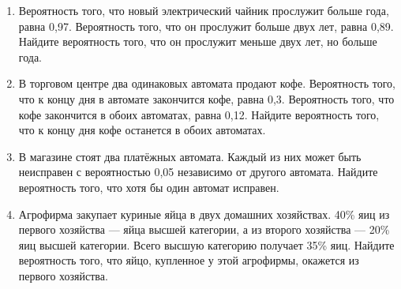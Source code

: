 \documentclass[pdftex,12pt,a4paper]{article}
\begin{document}
\begin{enumerate}

\item Вероятность того, что новый электрический чайник прослужит больше года, равна 0,97. Вероятность того, что он прослужит больше двух лет, равна 0,89. Найдите вероятность того, что он прослужит меньше двух лет, но больше года.

\item В торговом центре два одинаковых автомата продают кофе. Вероятность того, что к концу дня в автомате закончится кофе, равна 0,3. Вероятность того, что кофе закончится в обоих автоматах, равна 0,12. Найдите вероятность того, что к концу дня кофе останется в обоих автоматах.

\item В магазине стоят два платёжных автомата. Каждый из них может быть неисправен с вероятностью 0,05 независимо от другого автомата. Найдите вероятность того, что хотя бы один автомат исправен.

\item Агрофирма закупает куриные яйца в двух домашних хозяйствах. 40\% яиц из первого хозяйства — яйца высшей категории, а из второго хозяйства — 20\% яиц высшей категории. Всего высшую категорию получает 35\% яиц. Найдите вероятность того, что яйцо, купленное у этой агрофирмы, окажется из первого хозяйства.
\end{enumerate}

\end{document}
